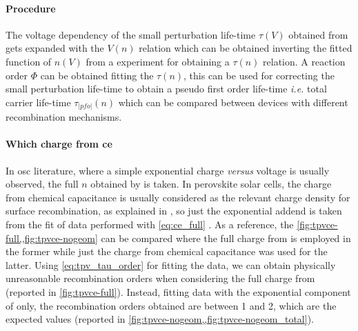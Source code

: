 		\paragraph{Procedure}
		The voltage dependency of the small perturbation life\hyp{}time $\tau(V)$ obtained from  gets expanded with the $V(n)$ relation which can be obtained inverting the fitted function of $n(V)$ from a  experiment for obtaining a $\tau(n)$ relation.
		A reaction order $\Phi$ can be obtained fitting the $\tau(n)$, this can be used for correcting the small perturbation life\hyp{}time to obtain a pseudo first order life\hyp{}time \textsl{i.e.} total carrier life\hyp{}time $\tau_|pfo|(n)$ which can be compared between devices with different recombination mechanisms.

		\paragraph{Which charge from \gls{ce}}
		In \gls{osc} literature, where a simple exponential charge \textsl{versus} voltage is usually observed, the full $n$ obtained by  is taken.
		In perovskite solar cells, the charge from chemical capacitance is usually considered as the relevant charge density for surface recombination, as explained in , so just the exponential addend is taken from the fit of  data performed with \cref{eq:ce_full} \cite{Du2018,Gelmetti2019,Wheeler2017}.
		As a reference, the \cref{fig:tpvce-full,,fig:tpvce-nogeom} can be compared where the full charge from  is employed in the former while just the charge from chemical capacitance was used for the latter.
		Using \cref{eq:tpv_tau_order} for fitting the data, we can obtain physically unreasonable recombination orders when considering the full charge from  (reported in \cref{fig:tpvce-full}).
		Instead, fitting data with the exponential component of  only, the recombination orders obtained are between 1 and 2, which are the expected values (reported in \cref{fig:tpvce-nogeom,,fig:tpvce-nogeom_total}).

